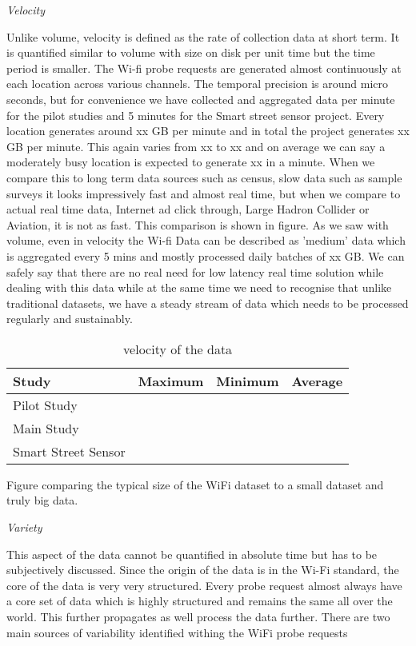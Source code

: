 \textit{Velocity}

Unlike volume, velocity is defined as the rate of collection data at short term.
It is quantified similar to volume with size on disk per unit time but the time period is smaller.
The Wi-fi probe requests are generated almost continuously at each location across various channels.
The temporal precision is around micro seconds, but for convenience we have collected and aggregated data per minute for the pilot studies and 5 minutes for the Smart street sensor project.
Every location generates around xx GB per minute and in total the project generates xx GB per minute.
This again varies from xx to xx and on average we can say a moderately busy location is expected to generate xx in a minute.
When we compare this to long term data sources such as census, slow data such as sample surveys it looks impressively fast and almost real time, but when we compare to actual real time data, Internet ad click through, Large Hadron Collider or Aviation, it is not as fast.
This comparison is shown in figure.
As we saw with volume, even in velocity the Wi-fi Data can be described as 'medium' data which is aggregated every 5 mins and mostly processed daily batches of xx GB.
We can safely say that there are no real need for low latency real time solution while dealing with this data while at the same time we need to recognise that unlike traditional datasets, we have a steady stream of data which needs to be processed regularly and sustainably.

\begin{table}
    \centering
    \begin{tabular}{|l|c|c|c|}
        \hline
        Study & Maximum & Minimum & Average \\
        \hline
        Pilot Study & & & \\
        Main Study & & & \\
        Smart Street Sensor & & & \\
        \hline
    \end{tabular}
    \caption{velocity of the data}
    \label{velocity_table}
\end{table}

Figure comparing the typical size of the WiFi dataset to a small dataset and truly big data.

\textit{Variety}

This aspect of the data cannot be quantified in absolute time but has to be subjectively discussed.
Since the origin of the data is in the Wi-Fi standard, the core of the data is very very structured.
Every probe request almost always have a core set of data which is highly structured and remains the same all over the world.
This further propagates as well process the data further.
There are two main sources of variability identified withing the WiFi probe requests


